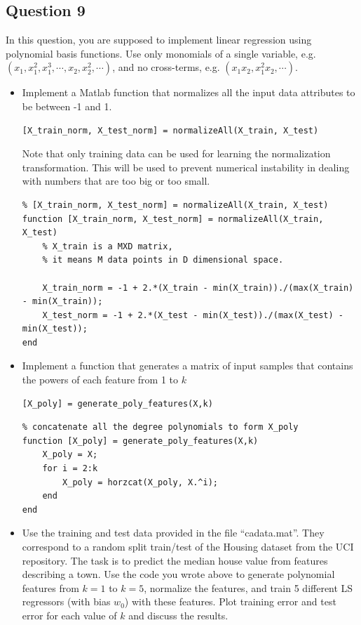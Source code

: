 \documentclass{article}
\begin{document}
\subsection{Question 9}
In this question, you are supposed to implement linear regression using polynomial basis functions. Use only monomials of a single variable, e.g. $(x_1, x_1^2, x_1^3, \cdots, x_2, x_2^2, \cdots)$, and no cross-terms, e.g. $(x_1 x_2, x_1^2 x_2, \cdots)$.
\begin{itemize}
\item Implement a Matlab function that normalizes all the input data attributes to be between -1 and 1.
\begin{verbatim}
[X_train_norm, X_test_norm] = normalizeAll(X_train, X_test)
\end{verbatim}
Note that only training data can be used for learning the normalization transformation. This will be used to prevent numerical instability in dealing with numbers that are too big or too small.

\begin{verbatim}
% [X_train_norm, X_test_norm] = normalizeAll(X_train, X_test)
function [X_train_norm, X_test_norm] = normalizeAll(X_train, X_test)
    % X_train is a MXD matrix, 
    % it means M data points in D dimensional space.

    X_train_norm = -1 + 2.*(X_train - min(X_train))./(max(X_train) - min(X_train));
    X_test_norm = -1 + 2.*(X_test - min(X_test))./(max(X_test) - min(X_test));
end
\end{verbatim}

\item Implement a function that generates a matrix of input samples that contains the powers of each feature from 1 to $k$
\begin{verbatim}
[X_poly] = generate_poly_features(X,k)
\end{verbatim}

\begin{verbatim}
% concatenate all the degree polynomials to form X_poly
function [X_poly] = generate_poly_features(X,k)
    X_poly = X;
    for i = 2:k
        X_poly = horzcat(X_poly, X.^i);
    end
end
\end{verbatim}

\item Use the training and test data provided in the file ``cadata.mat''. They correspond to a random split train/test of the Housing dataset from the UCI repository. The task is to predict the median house value from features describing a town.
Use the code you wrote above to generate polynomial features from $k=1$ to $k=5$, normalize the features, and train 5 different LS regressors (with bias $w_0$) with these features. Plot training error and test error for each value of $k$ and discuss the results.


\end{itemize}
\end{document}

